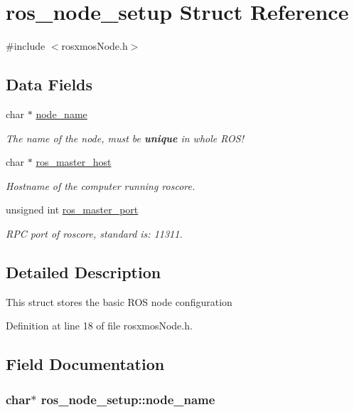 \hypertarget{structros__node__setup}{\section{ros\-\_\-node\-\_\-setup \-Struct \-Reference}
\label{structros__node__setup}
}


{\ttfamily \#include $<$rosxmos\-Node.\-h$>$}

\subsection*{\-Data \-Fields}
\begin{DoxyCompactItemize}
\item 
char $\ast$ \hyperlink{structros__node__setup_acb9f3c1fd42357510b97832bbc17896a}{node\-\_\-name}
\begin{DoxyCompactList}\small\item\em \-The name of the node, must be {\bfseries unique} in whole \-R\-O\-S! \end{DoxyCompactList}\item 
char $\ast$ \hyperlink{structros__node__setup_a8a95e9beff3361bb74a4a30dd3c50ba0}{ros\-\_\-master\-\_\-host}
\begin{DoxyCompactList}\small\item\em \-Hostname of the computer running roscore. \end{DoxyCompactList}\item 
unsigned int \hyperlink{structros__node__setup_a690ae2d601b53fca47aba50557a6b214}{ros\-\_\-master\-\_\-port}
\begin{DoxyCompactList}\small\item\em \-R\-P\-C port of roscore, standard is\-: 11311. \end{DoxyCompactList}\end{DoxyCompactItemize}


\subsection{\-Detailed \-Description}
\-This struct stores the basic \-R\-O\-S node configuration 

\-Definition at line 18 of file rosxmos\-Node.\-h.



\subsection{\-Field \-Documentation}
\hypertarget{structros__node__setup_acb9f3c1fd42357510b97832bbc17896a}{
\subsubsection[{node\-\_\-name}]{\setlength{\rightskip}{0pt plus 5cm}char$\ast$ {\bf ros\-\_\-node\-\_\-setup\-::node\-\_\-name}}}\label{structros__node__setup_acb9f3c1fd42357510b97832bbc17896a}


